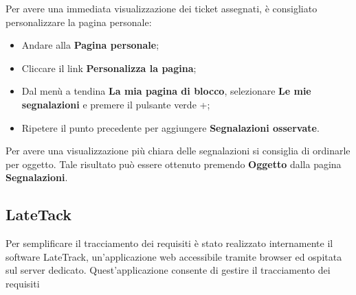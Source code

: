 	Per avere una immediata visualizzazione dei ticket assegnati, è consigliato personalizzare 
	la pagina personale: 
	\begin{itemize}
		\item Andare alla \textbf{Pagina personale}; 
		\item Cliccare il link \textbf{Personalizza la pagina}; 
		\item Dal menù a tendina \textbf{La mia pagina di blocco}, selezionare \textbf{Le mie segnalazioni} 
		e premere il pulsante verde +; 
		\item Ripetere il punto precedente per aggiungere \textbf{Segnalazioni osservate}. 
	
	\end{itemize}

	Per avere una visualizzazione più chiara delle segnalazioni si consiglia di ordinarle per 
	oggetto. Tale risultato può essere ottenuto premendo \textbf{Oggetto} dalla pagina \textbf{Segnalazioni}.

\subsection{LateTack}
Per semplificare il tracciamento dei requisiti è stato realizzato internamente il software
LateTrack, un’applicazione web accessibile tramite browser ed ospitata sul server dedicato.
Quest’applicazione consente di gestire il tracciamento dei requisiti

